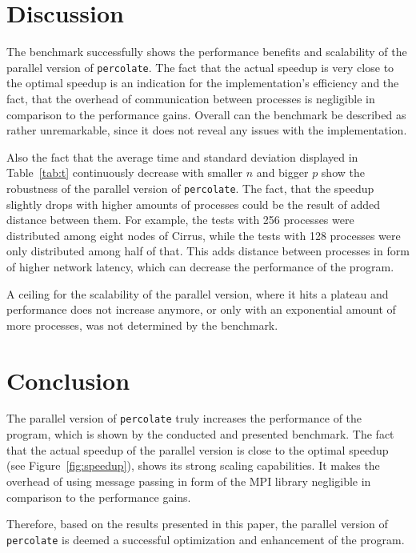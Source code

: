 \documentclass[twoside,11pt]{article}
\def\perc{\texttt{perco\-late}}
\begin{document}
\section{Discussion} %

The benchmark successfully shows the performance benefits
and scalability of the parallel version of \perc{}.
The fact that the actual speedup is very close to the
optimal speedup is an indication for the implementation's
efficiency and the fact, that the overhead of communication
between processes is negligible in comparison to the
performance gains.
Overall can the benchmark be described as rather
unremarkable, since it does not reveal any issues with the
implementation.

Also the fact that the average time and standard deviation
displayed in Table~\ref{tab:t} continuously decrease with
smaller $n$ and bigger $p$ show the robustness of the
parallel version of \perc{}.
The fact, that the speedup slightly drops with higher
amounts of processes could be the result of added distance
between them.
For example, the tests with 256 processes were distributed
among eight nodes of Cirrus, while the tests with 128
processes were only distributed among half of that.
This adds distance between processes in form of higher
network latency, which can decrease the performance of
the program.

A ceiling for the scalability of the parallel version,
where it hits a plateau and performance does not increase
anymore, or only with an exponential amount of more
processes, was not determined by the benchmark.


\section{Conclusion} %

The parallel version of \perc{} truly increases the
performance of the program, which is shown by the conducted
and presented benchmark.
The fact that the actual speedup of the parallel version is
close to the optimal speedup (see Figure~\ref{fig:speedup}),
shows its strong scaling capabilities.
It makes the overhead of using message passing in form of
the MPI library negligible in comparison to the performance
gains.

Therefore, based on the results presented in this paper,
the parallel version of \perc{} is deemed a successful
optimization and enhancement of the program.




\end{document}
